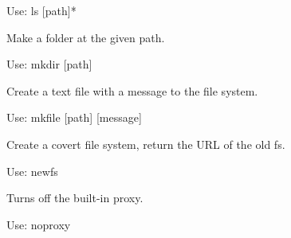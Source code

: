 \documentclass[letterpaper,12pt,openany,oneside]{sphinxmanual}
\begin{document}
\begin{fulllineitems}
\begin{fulllineitems}
Use: ls {[}path{]}*

\end{fulllineitems}


\begin{fulllineitems}
\label{console:webStegFS.console.Console.do_mkdir}
Make a folder at the given path.

Use: mkdir {[}path{]}

\end{fulllineitems}


\begin{fulllineitems}
\label{console:webStegFS.console.Console.do_mkfile}
Create a text file with a message to the file system.

Use: mkfile {[}path{]} {[}message{]}

\end{fulllineitems}


\begin{fulllineitems}
\label{console:webStegFS.console.Console.do_mount}
\end{fulllineitems}


\begin{fulllineitems}
\label{console:webStegFS.console.Console.do_newfs}
Create a covert file system, return the URL of the old fs.

Use: newfs

\end{fulllineitems}


\begin{fulllineitems}
\label{console:webStegFS.console.Console.do_noproxy}
Turns off the built-in proxy.

Use: noproxy

\end{fulllineitems}


\end{fulllineitems}
\end{document}
